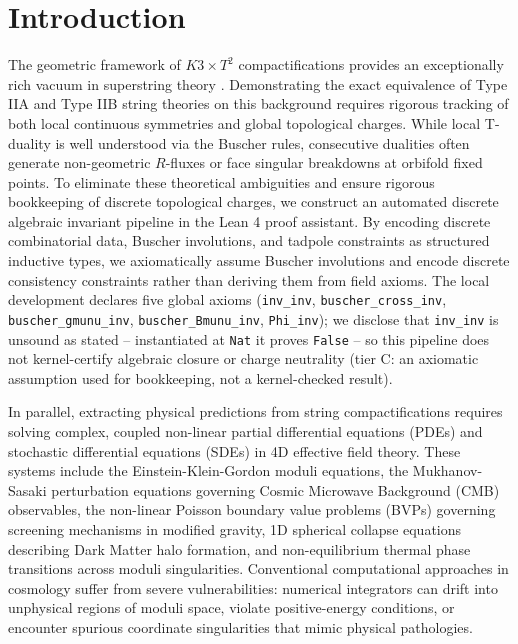 \documentclass[11pt,a4paper]{article}
\begin{document}
\section{Introduction}
The geometric framework of $K3 \times T^2$ compactifications provides an exceptionally rich vacuum in superstring theory \cite{buscher1987}. Demonstrating the exact equivalence of Type IIA and Type IIB string theories on this background requires rigorous tracking of both local continuous symmetries and global topological charges. While local T-duality is well understood via the Buscher rules, consecutive dualities often generate non-geometric $R$-fluxes or face singular breakdowns at orbifold fixed points. To eliminate these theoretical ambiguities and ensure rigorous bookkeeping of discrete topological charges, we construct an automated discrete algebraic invariant pipeline in the Lean 4 proof assistant. By encoding discrete combinatorial data, Buscher involutions, and tadpole constraints as structured inductive types, we axiomatically assume Buscher involutions and encode discrete consistency constraints rather than deriving them from field axioms. The local development declares five global axioms (\texttt{inv\_inv}, \texttt{buscher\_cross\_inv}, \texttt{buscher\_gmunu\_inv}, \texttt{buscher\_Bmunu\_inv}, \texttt{Phi\_inv}); we disclose that \texttt{inv\_inv} is unsound as stated -- instantiated at \texttt{Nat} it proves \texttt{False} -- so this pipeline does not kernel-certify algebraic closure or charge neutrality (tier C: an axiomatic assumption used for bookkeeping, not a kernel-checked result).

In parallel, extracting physical predictions from string compactifications requires solving complex, coupled non-linear partial differential equations (PDEs) and stochastic differential equations (SDEs) in 4D effective field theory. These systems include the Einstein-Klein-Gordon moduli equations, the Mukhanov-Sasaki perturbation equations governing Cosmic Microwave Background (CMB) observables, the non-linear Poisson boundary value problems (BVPs) governing screening mechanisms in modified gravity, 1D spherical collapse equations describing Dark Matter halo formation, and non-equilibrium thermal phase transitions across moduli singularities. Conventional computational approaches in cosmology suffer from severe vulnerabilities: numerical integrators can drift into unphysical regions of moduli space, violate positive-energy conditions, or encounter spurious coordinate singularities that mimic physical pathologies.
\end{document}
